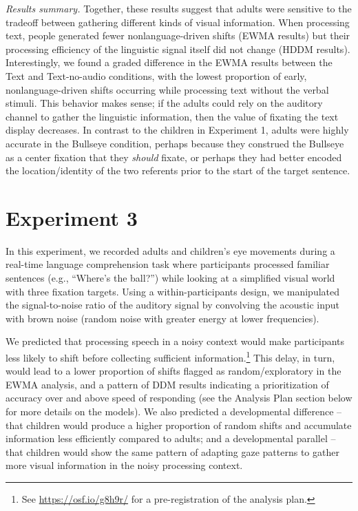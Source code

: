 \documentclass[english,floatsintext,man]{apa6}
\theoremstyle{definition}
\theoremstyle{definition}
\theoremstyle{definition}
\theoremstyle{remark}
\begin{document}
\emph{Results summary.} Together, these results suggest that adults were
sensitive to the tradeoff between gathering different kinds of visual
information. When processing text, people generated fewer
nonlanguage-driven shifts (EWMA results) but their processing efficiency
of the linguistic signal itself did not change (HDDM results).
Interestingly, we found a graded difference in the EWMA results between
the Text and Text-no-audio conditions, with the lowest proportion of
early, nonlanguage-driven shifts occurring while processing text without
the verbal stimuli. This behavior makes sense; if the adults could rely
on the auditory channel to gather the linguistic information, then the
value of fixating the text display decreases. In contrast to the
children in Experiment 1, adults were highly accurate in the Bullseye
condition, perhaps because they construed the Bullseye as a center
fixation that they \emph{should} fixate, or perhaps they had better
encoded the location/identity of the two referents prior to the start of
the target sentence.

\hypertarget{experiment-3}{%
\section{Experiment 3}\label{experiment-3}}

In this experiment, we recorded adults and children's eye movements
during a real-time language comprehension task where participants
processed familiar sentences (e.g., \enquote{Where's the ball?}) while
looking at a simplified visual world with three fixation targets. Using
a within-participants design, we manipulated the signal-to-noise ratio
of the auditory signal by convolving the acoustic input with brown noise
(random noise with greater energy at lower frequencies).

We predicted that processing speech in a noisy context would make
participants less likely to shift before collecting sufficient
information.\footnote{See \url{https://osf.io/g8h9r/} for a
  pre-registration of the analysis plan.} This delay, in turn, would
lead to a lower proportion of shifts flagged as random/exploratory in
the EWMA analysis, and a pattern of DDM results indicating a
prioritization of accuracy over and above speed of responding (see the
Analysis Plan section below for more details on the models). We also
predicted a developmental difference -- that children would produce a
higher proportion of random shifts and accumulate information less
efficiently compared to adults; and a developmental parallel -- that
children would show the same pattern of adapting gaze patterns to gather
more visual information in the noisy processing context.
\end{document}
